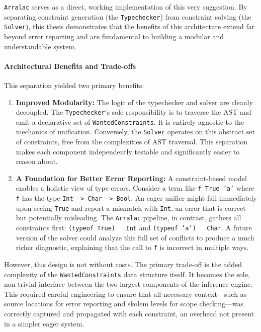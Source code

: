 \texttt{Arralac} serves as a direct, working implementation of this very suggestion. By separating constraint generation (the \texttt{Typechecker}) from constraint solving (the \texttt{Solver}), this thesis demonstrates that the benefits of this architecture extend far beyond error reporting and are fundamental to building a modular and understandable system.

\paragraph{Architectural Benefits and Trade-offs}
This separation yielded two primary benefits:
\begin{enumerate}
    \item \textbf{Improved Modularity:} The logic of the typechecker and solver are cleanly decoupled. The \texttt{Typechecker}'s sole responsibility is to traverse the AST and emit a declarative set of \texttt{WantedConstraints}. It is entirely agnostic to the mechanics of unification. Conversely, the \texttt{Solver} operates on this abstract set of constraints, free from the complexities of AST traversal. This separation makes each component independently testable and significantly easier to reason about.
    \item \textbf{A Foundation for Better Error Reporting:} A constraint-based model enables a holistic view of type errors. Consider a term like \texttt{f True 'a'} where \texttt{f} has the type \texttt{Int -> Char -> Bool}. An eager unifier might fail immediately upon seeing \texttt{True} and report a mismatch with \texttt{Int}, an error that is correct but potentially misleading. The \texttt{Arralac} pipeline, in contrast, gathers all constraints first: \texttt{(typeof True) ~ Int} and \texttt{(typeof 'a') ~ Char}. A future version of the solver could analyze this full set of conflicts to produce a much richer diagnostic, explaining that the call to \texttt{f} is incorrect in multiple ways.
\end{enumerate}

However, this design is not without costs. The primary trade-off is the added complexity of the \texttt{WantedConstraints} data structure itself. It becomes the sole, non-trivial interface between the two largest components of the inference engine. This required careful engineering to ensure that all necessary context---such as source locations for error reporting and skolem levels for scope checking---was correctly captured and propagated with each constraint, an overhead not present in a simpler eager system.

